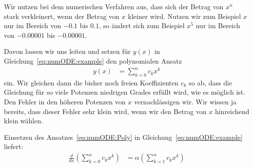 \documentclass{article}
\let\l\left\let\r\right\let\cs\csname\let\ecs\endcsname\let\ea\expandafter
\def\ddx#1{\frac{d#1}{dx}}
\begin{document}
Wir nutzen bei dem numerischen Verfahren aus, dass sich der Betrag von $x^n$ stark verkleinert, wenn der Betrag von $x$ kleiner wird. Nutzen wir zum Beispiel $x$ nur im Bereich von $-0.1$ bis $0.1$, so ändert sich zum Beispiel $x^5$ nur im Bereich von $-0.00001$ bis $-0.00001$.

Davon lassen wir uns leiten und setzen für $y(x)$ in Gleichung~\eqref{eq:numODE:example} den polynomialen Ansatz
\begin{align}
  y(x) &= \sum_{k=0}^n c_k x^k
         \label{eq:numODE:Poly}
\end{align}
ein. Wir gleichen dann die bisher noch freien Koeffizienten $c_k$ so
ab, dass die Gleichung für so viele Potenzen niedrigen Grades erfüllt
wird, wie es möglich ist. Den Fehler in den höheren Potenzen von $x$
vernachlässigen wir. Wir wissen ja bereits, dass dieser Fehler sehr
klein wird, wenn wir den Betrag von $x$ hinreichend klein wählen.

Einsetzen des Ansatzes~\eqref{eq:numODE:Poly} in Gleichung~\eqref{eq:numODE:example} liefert:
\begin{align*}
  \ddx{}\l(\sum_{k=0}^n c_k x^k\r) &=\alpha\l(\sum_{k=1}^n c_k x^k\r)
\end{align*}
\end{document}
